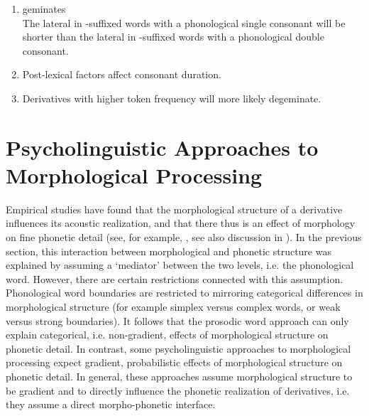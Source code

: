\begin{enumerate}
	

	
	\item  {} geminates \\
	The lateral in -suffixed words with a phonological single consonant will be shorter than the lateral in -suffixed words with a phonological double consonant. 
	
	\item Post-lexical factors affect consonant duration.
	
		\item Derivatives with higher token frequency will more likely degeminate.
	
\end{enumerate}






\section{Psycholinguistic Approaches to Morphological Processing} \label{Morphological Gemination: Implications for Psycholinguistic Theories of Morphological Processing}

Empirical studies have found that the morphological structure of a derivative influences its acoustic realization, and that there thus is an effect of morphology on fine phonetic detail (see, for example, \citealt{Sproat.1993b, Cho.2001, Sugahara.2009, Pluymaekers.2010, Smith.2012, LeeKim.2013, Plag.2017}, see also discussion in ). 
In the previous section, this interaction between morphological and phonetic structure was explained by assuming a `mediator' between the two levels, i.e. the phonological word. However, there are certain restrictions connected with this assumption. Phonological word boundaries are restricted to mirroring categorical differences in morphological structure (for example simplex versus complex words, or weak versus strong boundaries). It follows that the prosodic word approach can only explain categorical, i.e. non-gradient, effects of morphological structure on phonetic detail. 
In contrast, some psycholinguistic approaches to morphological processing expect gradient, probabilistic effects of morphological structure on phonetic detail. In general, these approaches assume morphological structure to be gradient and to directly influence the phonetic realization of derivatives, i.e. they assume a direct morpho-phonetic interface. 

